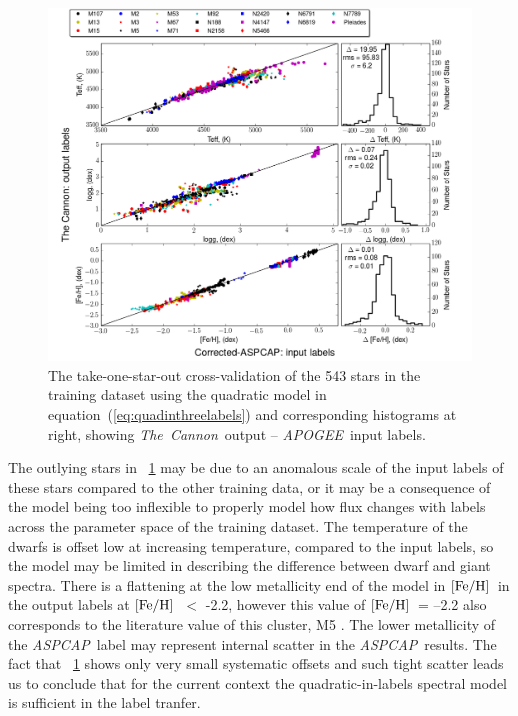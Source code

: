 \documentclass[12pt, preprint]{aastex}
\newcommand{\tc}{\textsl{The~Cannon}}
\newcommand{\apogee}{\textsl{APOGEE}}
\newcommand{\aspcap}{\textsl{ASPCAP}}
\newcommand{\teff}{\mbox{$\rm T_{eff}$}}
\newcommand{\feh}{\mbox{$\rm [Fe/H]$}}
\newcommand{\logg}{\mbox{$\rm \log g$}}
\begin{document}

\begin{figure}[h!]
\centering
    \includegraphics[scale=0.45]{./plots/takeout_histc.png}
\caption{The take-one-star-out cross-validation of the 543 stars in the training dataset using the quadratic model in equation~(\ref{eq:quadinthreelabels}) and corresponding histograms at right, showing \tc\ output -- \apogee\ input labels.}
\label{fig:takeonestarout}
\end{figure}

The outlying stars in \figurename~\ref{fig:takeonestarout} may be due to an anomalous scale of the input labels of these stars compared to the other training data, or it may be a consequence of the model being too inflexible to properly model how flux changes with labels across the parameter space of the training dataset. 
The temperature of the dwarfs is offset low at increasing temperature, compared to the input labels, so the model may be limited in describing the difference between dwarf and giant spectra. 
There is a flattening at the low metallicity end of the model in \feh\ in the output labels at \feh\ $<$ -2.2, however this value of \feh\ = --2.2 also corresponds to the literature value of this cluster, M5 \citep{Meszaros2013}. 
The lower metallicity of the \aspcap\ label may represent internal scatter in the \aspcap\ results.
The fact that \figurename~\ref{fig:takeonestarout} shows only very small systematic offsets and such tight scatter leads us to conclude that for the
current context the quadratic-in-labels spectral model is sufficient in the label tranfer. 
\end{document}
